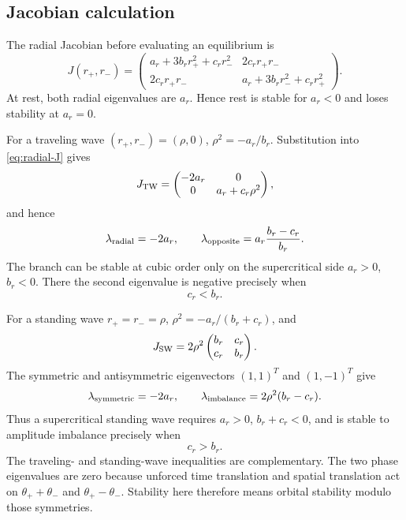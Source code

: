 \documentclass[11pt]{article}
\begin{document}
\subsection{Jacobian calculation}

The radial Jacobian before evaluating an equilibrium is
\begin{equation}
 J(r_+,r_-)=
 \begin{pmatrix}
 a_r+3b_rr_+^2+c_rr_-^2 & 2c_rr_+r_-\\
 2c_rr_+r_- & a_r+3b_rr_-^2+c_rr_+^2
 \end{pmatrix}.
 \label{eq:radial-J}
\end{equation}
At rest, both radial eigenvalues are $a_r$.  Hence rest is stable for
$a_r<0$ and loses stability at $a_r=0$.

For a traveling wave $(r_+,r_-)=(\rho,0)$,
$\rho^2=-a_r/b_r$.  Substitution into \eqref{eq:radial-J} gives
\begin{equation}
 J_{\rm TW}=
 \begin{pmatrix}
 -2a_r&0\\0&a_r+c_r\rho^2
 \end{pmatrix},
\end{equation}
and hence
\begin{equation}
 \lambda_{\rm radial}=-2a_r,\qquad
 \lambda_{\rm opposite}=a_r\frac{b_r-c_r}{b_r}.
 \label{eq:tw-eigs}
\end{equation}
The branch can be stable at cubic order only on the supercritical side
$a_r>0$, $b_r<0$.  There the second eigenvalue is negative precisely when
\begin{equation}
 c_r<b_r.
 \label{eq:tw-stability}
\end{equation}

For a standing wave $r_+=r_-=\rho$,
$\rho^2=-a_r/(b_r+c_r)$, and
\begin{equation}
 J_{\rm SW}=2\rho^2
 \begin{pmatrix}b_r&c_r\\c_r&b_r\end{pmatrix}.
\end{equation}
The symmetric and antisymmetric eigenvectors $(1,1)^T$ and $(1,-1)^T$ give
\begin{equation}
 \lambda_{\rm symmetric}=-2a_r,\qquad
 \lambda_{\rm imbalance}=2\rho^2(b_r-c_r).
 \label{eq:sw-eigs}
\end{equation}
Thus a supercritical standing wave requires $a_r>0$, $b_r+c_r<0$, and is
stable to amplitude imbalance precisely when
\begin{equation}
 c_r>b_r.
 \label{eq:sw-stability}
\end{equation}
The traveling- and standing-wave inequalities are complementary.  The two
phase eigenvalues are zero because unforced time translation and spatial
translation act on $\theta_++\theta_-$ and $\theta_+-\theta_-$.  Stability
here therefore means orbital stability modulo those symmetries.
\end{document}
